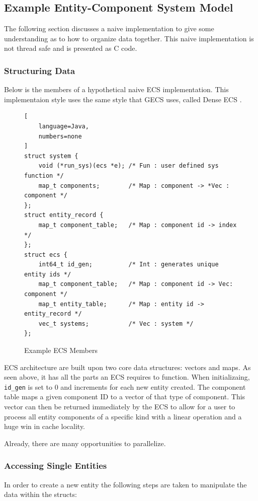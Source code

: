\subsection{Example Entity-Component System Model}
\label{sec:ecs_naive}
The following section discusses a naive implementation to give some understanding as to how to organize data together. This
naive implementation is not thread safe and is presented as C code.

\subsubsection{Structuring Data}

Below is the members of a hypothetical naive ECS implementation. This implementaion style uses the same style that GECS
uses, called Dense ECS \cite{EnTT_SparseSets}.

\begin{figure}[H]
\begin{lstlisting}[
    language=Java,
    numbers=none
]
struct system {
    void (*run_sys)(ecs *e); /* Fun : user defined sys function */
    map_t components;        /* Map : component -> *Vec : component */
};
struct entity_record {
    map_t component_table;   /* Map : component id -> index */
};
struct ecs {
    int64_t id_gen;          /* Int : generates unique entity ids */
    map_t component_table;   /* Map : component id -> Vec: component */
    map_t entity_table;      /* Map : entity id -> entity_record */
    vec_t systems;           /* Vec : system */
};
\end{lstlisting}
    \caption{Example ECS Members}
    \label{code:naive_ecs_data}
\end{figure}

ECS architecture are built upon two core data structures: vectors and maps. As seen above, it has all the parts an ECS requires to function. When initializaing, \texttt{id\_gen} is set to 0 and increments for each new entity created. The component table maps a given component ID to a vector of that type of component. This vector can then be returned immediately by the ECS to allow for a user to process all entity components of a specific kind with a linear operation and a huge win in cache locality.  

Already, there are many opportunities to parallelize.

\subsubsection{Accessing Single Entities}
In order to create a new entity the following steps are taken to manipulate the data within the structs:

